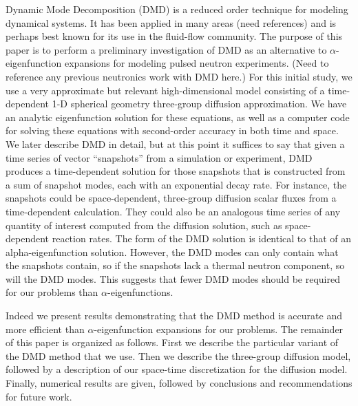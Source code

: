 \documentclass[12pt]{article}
\begin{document}
Dynamic Mode Decomposition (DMD) is a reduced order technique for modeling dynamical systems.  It has been applied 
in many areas (need references) and is perhaps best known for its use in the fluid-flow community.  The purpose of 
this paper is to perform a preliminary investigation of DMD as an alternative to $\alpha$-eigenfunction expansions 
for modeling pulsed neutron experiments. (Need to reference any previous neutronics work with DMD here.) 
For this initial study, we use a very approximate but relevant 
high-dimensional model consisting of a time-dependent 1-D spherical geometry three-group diffusion approximation. 
We have an analytic eigenfunction solution for these equations, as well as a computer code for solving 
these equations with second-order accuracy in both time and space.  We later describe DMD in detail, but at 
this point it suffices to say that given a time series of vector ``snapshots'' from a simulation or experiment, 
DMD produces a time-dependent solution for those snapshots that is constructed from a sum of snapshot modes, each with 
an exponential decay rate.  For instance, the snapshots could be space-dependent, three-group diffusion scalar fluxes 
from a time-dependent calculation.  They could also be an analogous time series of any quantity of interest computed 
from the diffusion solution, such as space-dependent reaction rates.  The form of the DMD solution is identical to that 
of an alpha-eigenfunction solution.  However, the DMD modes can only contain what the snapshots contain, so if the snapshots 
lack a thermal neutron component, so will the DMD modes.  This suggests that fewer DMD modes should be required for 
our problems than $\alpha$-eigenfunctions.

Indeed we present results demonstrating that the DMD method is accurate and more efficient than 
$\alpha$-eigenfunction expansions for our problems.  The remainder of this paper is organized as follows.  First we describe 
the particular variant of the DMD method that we use.  Then we describe the three-group diffusion model, followed by a 
description of our space-time discretization for the diffusion model.  Finally, numerical results are given, followed by 
conclusions and recommendations for future work.
\end{document}
